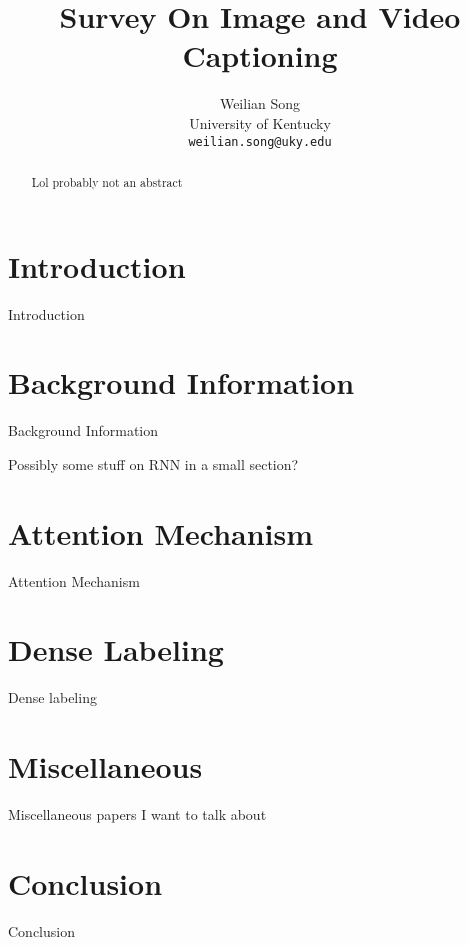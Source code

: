 \documentclass[10pt,twocolumn,letterpaper]{article}
\begin{document}
\title{Survey On Image and Video Captioning}

\author{Weilian Song\\
University of Kentucky\\
{\tt\small weilian.song@uky.edu}
}

\maketitle

\begin{abstract}
  Lol probably not an abstract
\end{abstract}

\section{Introduction}

Introduction

\section{Background Information}

Background Information

Possibly some stuff on RNN in a small section?

\section{Attention Mechanism}

Attention Mechanism

\section{Dense Labeling}

Dense labeling

\section{Miscellaneous}

Miscellaneous papers I want to talk about

\section{Conclusion}

Conclusion

{\small


}
\end{document}

